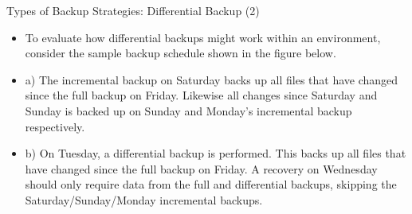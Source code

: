 \documentclass[aspectratio=169, xcolor=dvipsnames]{beamer}
\begin{document}
\begin{frame}{Types of Backup Strategies: Differential Backup (2)}
    \begin{itemize}[<+->]
        \item To evaluate how differential backups might work within an environment, consider the sample backup schedule shown in the figure below.
        \item a) The incremental backup on Saturday backs up all files that have changed since the full backup on Friday. Likewise all changes since Saturday and Sunday is backed up on Sunday and Monday's incremental backup respectively.
        \item b) On Tuesday, a differential backup is performed. This backs up all files that have changed since the full backup on Friday. A recovery on Wednesday should only require data from the full and differential backups, skipping the Saturday/Sunday/Monday incremental backups.
    \end{itemize}
\end{frame}
\end{document}
